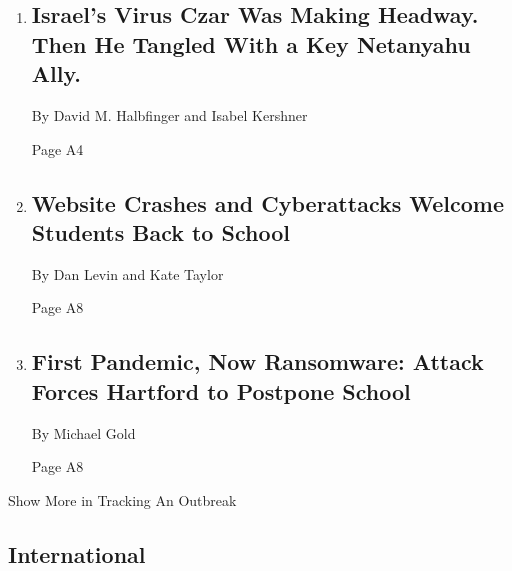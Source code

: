 \begin{enumerate}
\def\labelenumi{\arabic{enumi}.}
\item
  \href{/2020/09/08/world/middleeast/israel-coronavirus-ronni-gamzu-netanyahu.html}{}

  \hypertarget{israels-virus-czar-was-making-headway-then-he-tangled-with-a-key-netanyahu-ally}{%
  \subsection{Israel's Virus Czar Was Making Headway. Then He Tangled
  With a Key Netanyahu
  Ally.}\label{israels-virus-czar-was-making-headway-then-he-tangled-with-a-key-netanyahu-ally}}

  By David M. Halbfinger and Isabel Kershner

  Page A4
\item
  \href{/2020/09/08/us/school-districts-cyberattacks-glitches.html}{}

  \hypertarget{website-crashes-and-cyberattacks-welcome-students-back-to-school-1}{%
  \subsection{Website Crashes and Cyberattacks Welcome Students Back to
  School}\label{website-crashes-and-cyberattacks-welcome-students-back-to-school-1}}

  By Dan Levin and Kate Taylor

  Page A8
\item
  \href{/2020/09/08/nyregion/hartford-schools-ransomware.html}{}

  \hypertarget{first-pandemic-now-ransomware-attack-forces-hartford-to-postpone-school-1}{%
  \subsection{First Pandemic, Now Ransomware: Attack Forces Hartford to
  Postpone
  School}\label{first-pandemic-now-ransomware-attack-forces-hartford-to-postpone-school-1}}

  By Michael Gold

  Page A8
\end{enumerate}

Show More in Tracking An Outbreak

\hypertarget{international}{%
\subsection{International}\label{international}}

